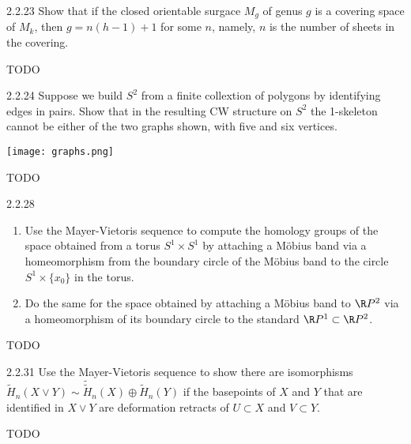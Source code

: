 \documentclass{article}
\begin{document}
\begin{exercise}{2.2.23}{\parindent}
  Show that if the closed orientable surgace $M_g$ of genus $g$ is a
  covering space of $M_k$, then $g = n(h-1) + 1$ for some $n$, namely,
  $n$ is the number of sheets in the covering.
\end{exercise}
\begin{solution}{\parindent}
  TODO
\end{solution}

\begin{exercise}{2.2.24}{\parindent}
  Suppose we build $S^2$ from a finite collextion of polygons by
  identifying edges in pairs. Show that in the resulting CW structure
  on $S^2$ the 1-skeleton cannot be either of the two graphs shown,
  with five and six vertices.
  \begin{center}
    \texttt{[image: graphs.png]}
  \end{center}
\end{exercise}
\begin{solution}{\parindent}
  TODO
\end{solution}

\begin{exercise}{2.2.28}{\parindent}
  \vspace*{-\bigskipamount}
  \begin{enumerate}
  \item Use the Mayer-Vietoris sequence to compute the homology groups
    of the space obtained from a torus $S^1 \times S^1$ by attaching a
    M\"{o}bius band via a homeomorphism from the boundary circle of
    the M\"{o}bius band to the circle $S^1 \times \{x_0\}$ in the
    torus.
  \item Do the same for the space obtained by attaching a M\"{o}bius
    band to $\R P^2$ via a homeomorphism of its boundary circle to the
    standard $\R P^1 \subset \R P^2$.
  \end{enumerate}
\end{exercise}
\begin{solution}{\parindent}
  TODO
\end{solution}

\begin{exercise}{2.2.31}{\parindent}
  Use the Mayer-Vietoris sequence to show there are isomorphisms
  $\tilde{H}_n(X \vee Y) \sim \tilde \tilde{H}_n(X) \oplus
  \tilde{H}_n(Y)$ if the basepoints of $X$ and $Y$ that are identified
  in $X \vee Y$ are deformation retracts of $U \subset X$ and $V
  \subset Y$.
\end{exercise}
\begin{solution}{\parindent}
  TODO
\end{solution}
\end{document}
